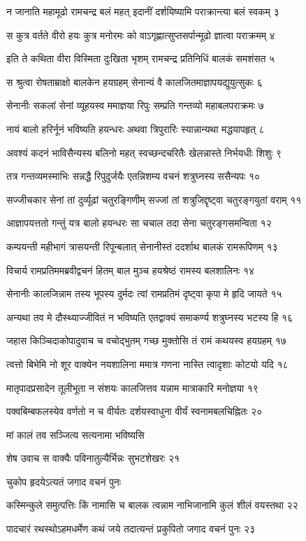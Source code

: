 न जानाति महामूढो रामचन्द्र बलं महत्
इदानीं दर्शयिष्यामि पराक्रान्त्या बलं स्वकम् ३

स कुत्र वर्तते वीरो हयः कुत्र मनोरमः
को वाऽगृह्णात्सुप्तसर्पान्मूढो ज्ञात्वा पराक्रमम् ४

इति ते कथिता वीरा विस्मिता दुःखिता भृशम्
रामचन्द्र प्रतिनिधिं बालकं समशंसत ५

स श्रुत्वा रोषताम्राक्षो बालकेन हयग्रहम्
सेनान्यं वै कालजितमाज्ञापयद्युयुत्सुकः ६

सेनानीः सकलां सेनां व्यूहयस्व ममाज्ञया
रिपुः सम्प्रति गन्तव्यो महाबलपराक्रमः ७

नायं बालो हरिर्नूनं भविष्यति हयन्धरः
अथवा त्रिपुरारिः स्यान्नान्यथा मद्धयापहृत् ८

अवश्यं कदनं भाविसैन्यस्य बलिनो महत्
स्वच्छन्दचरितैः खेलन्नास्ते निर्भयधीः शिशुः ९

तत्र गन्तव्यमस्माभिः सन्नद्धै रिपुदुर्जयैः
एतन्निशम्य वचनं शत्रुघ्नस्य ससैन्यपः १०

सज्जीचकार सेनां तां दुर्व्यूढां चतुरङ्गिणीम्
सज्जां तां शत्रुजिद्दृष्ट्वा चतुरङ्गयुतां वराम् ११

आज्ञापयत्ततो गन्तुं यत्र बालो हयन्धरः
सा चचाल तदा सेना चतुरङ्गसमन्विता १२

कम्पयन्ती महीभागं त्रासयन्ती रिपून्बलात्
सेनानीस्तं ददर्शाथ बालकं रामरूपिणम् १३

विचार्य रामप्रतिममब्रवीद्वचनं हितम्
बाल मुञ्च हयश्रेष्ठं रामस्य बलशालिनः १४

सेनानीः कालजिन्नाम तस्य भूपस्य दुर्मदः
त्वां रामप्रतिमं दृष्ट्वा कृपा मे हृदि जायते १५

अन्यथा तव मे दौस्थ्याज्जीवितं न भविष्यति
एतद्वाक्यं समाकर्ण्य शत्रुघ्नस्य भटस्य हि १६

जहास किञ्चिदाकोपादुवाच च वचोद्भुतम्
गच्छ मुक्तोसि तं रामं कथयस्व हयग्रहम् १७

त्वत्तो बिभेमि नो शूर वाक्येन नयशालिना
ममात्र गणना नास्ति त्वादृशाः कोटयो यदि १८

मातृपादप्रसादेन तूलीभूता न संशयः
कालजित्तव यन्नाम मात्राकारि मनोज्ञया १९

पक्वबिम्बफलस्येव वर्णतो न च वीर्यतः
दर्शयस्वाधुना वीर्यं स्वनामबलचिह्नितः २०

मां कालं तव सञ्जित्य सत्यनामा भविष्यसि

शेष उवाच
स वाक्यैः पविनातुल्यैर्भिन्नः सुभटशेखरः २१

चुकोप हृदयेऽत्यतं जगाद वचनं पुनः

कस्मिन्कुले समुत्पत्तिः किं नामासि च बालक
त्वन्नाम नाभिजानामि कुलं शीलं वयस्तथा २२

पादचारं रथस्थोऽहमधर्मेण कथं जये
तदात्यन्तं प्रकुपितो जगाद वचनं पुनः २३

